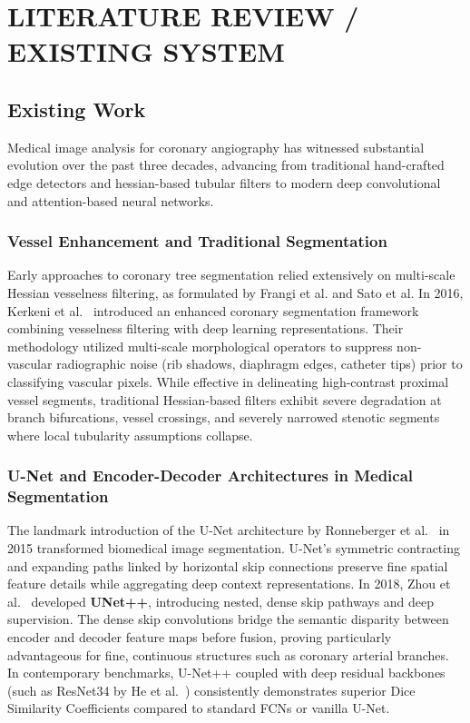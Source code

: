 \chapter{LITERATURE REVIEW / EXISTING SYSTEM}

\section{Existing Work}
Medical image analysis for coronary angiography has witnessed substantial evolution over the past three decades, advancing from traditional hand-crafted edge detectors and hessian-based tubular filters to modern deep convolutional and attention-based neural networks.

\subsection{Vessel Enhancement and Traditional Segmentation}
Early approaches to coronary tree segmentation relied extensively on multi-scale Hessian vesselness filtering, as formulated by Frangi et al. and Sato et al. In 2016, Kerkeni et al.~\cite{kerkeni2016coronary} introduced an enhanced coronary segmentation framework combining vesselness filtering with deep learning representations. Their methodology utilized multi-scale morphological operators to suppress non-vascular radiographic noise (rib shadows, diaphragm edges, catheter tips) prior to classifying vascular pixels. While effective in delineating high-contrast proximal vessel segments, traditional Hessian-based filters exhibit severe degradation at branch bifurcations, vessel crossings, and severely narrowed stenotic segments where local tubularity assumptions collapse.

\subsection{U-Net and Encoder-Decoder Architectures in Medical Segmentation}
The landmark introduction of the U-Net architecture by Ronneberger et al.~\cite{ronneberger2015u} in 2015 transformed biomedical image segmentation. U-Net's symmetric contracting and expanding paths linked by horizontal skip connections preserve fine spatial feature details while aggregating deep context representations. In 2018, Zhou et al.~\cite{zhou2018unetplusplus} developed \textbf{UNet++}, introducing nested, dense skip pathways and deep supervision. The dense skip convolutions bridge the semantic disparity between encoder and decoder feature maps before fusion, proving particularly advantageous for fine, continuous structures such as coronary arterial branches. In contemporary benchmarks, U-Net++ coupled with deep residual backbones (such as ResNet34 by He et al.~\cite{he2016deep}) consistently demonstrates superior Dice Similarity Coefficients compared to standard FCNs or vanilla U-Net.

